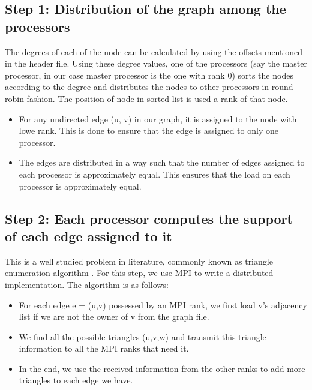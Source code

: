 \documentclass{article}
\begin{document}
\subsection{Step 1: Distribution of the graph among the processors}
The degrees of each of the node can be calculated by using the offsets mentioned in the header file. Using these degree values, one of the processors (say the master processor, in our case master processor is the one with rank 0) sorts the nodes according to the degree and distributes the nodes to other processors in round robin fashion. The position of node in sorted list is used a rank of that node. \\
\begin{itemize}
    \item For any undirected edge (u, v) in our graph, it is assigned to the node with lowe rank. This is done to ensure that the edge is assigned to only one processor.
    \item The edges are distributed in a way such that the number of edges assigned to each processor is approximately equal. This ensures that the load on each processor is approximately equal.
\end{itemize}

\subsection{Step 2: Each processor computes the support of each edge assigned to it}
This is a well studied problem in literature, commonly known as triangle enumeration algorithm . For this step, we use MPI to write a distributed implementation. The algorithm is as follows:

\begin{itemize}
    \item For each edge e = (u,v) possessed by an MPI rank, we first load v's adjacency list if we are not the owner of v from the graph file.
    \item We find all the possible triangles (u,v,w) and transmit this triangle information to all the MPI ranks that need it.
    \item In the end, we use the received information from the other ranks to add more triangles to each edge we have.
\end{itemize}
\end{document}
